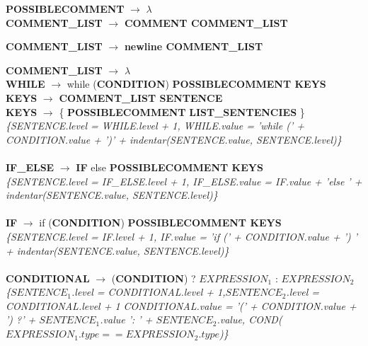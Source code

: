 \documentclass[10pt,a4paper]{article}
\begin{document}
\textbf{POSSIBLECOMMENT} $\rightarrow$ $\lambda$ \\

\textbf{COMMENT\_LIST} $\rightarrow$ \textbf{COMMENT COMMENT\_LIST } 

\textbf{COMMENT\_LIST} $\rightarrow$ \textbf{newline COMMENT\_LIST } 

\textbf{COMMENT\_LIST} $\rightarrow$ $\lambda$ \\

\textbf{WHILE} $\rightarrow$ while (\textbf{CONDITION}) \textbf{POSSIBLECOMMENT KEYS} \\

\textbf{KEYS} $\rightarrow$ \textbf{COMMENT\_LIST SENTENCE} \\ 

\textbf{KEYS} $\rightarrow$ \{ \textbf{POSSIBLECOMMENT} \textbf{LIST\_SENTENCIES} \} \\

\textit{\{SENTENCE.level = WHILE.level + 1, WHILE.value = 'while (' + CONDITION.value + ')' + indentar(SENTENCE.value, SENTENCE.level)\}}  \\ \\

\textbf{IF\_ELSE} $\rightarrow$ \textbf{IF} else \textbf{POSSIBLECOMMENT KEYS} \\

\textit{\{SENTENCE.level = IF\_ELSE.level + 1, IF\_ELSE.value = IF.value + 'else ' + indentar(SENTENCE.value, SENTENCE.level)\}}  \\ \\

\textbf{IF} $\rightarrow$ if (\textbf{CONDITION}) \textbf{POSSIBLECOMMENT KEYS} \\

\textit{\{SENTENCE.level = IF.level + 1, IF.value = 'if (' + CONDITION.value + ') ' + indentar(SENTENCE.value, SENTENCE.level)\}}  \\ \\

\textbf{CONDITIONAL} $\rightarrow$ (\textbf{CONDITION}) ? \textbf{$EXPRESSION_{1}$} : \textbf{$EXPRESSION_{2}$}  \\

\textit{\{$SENTENCE_{1}$.level = CONDITIONAL.level + 1,$SENTENCE_{2}$.level = CONDITIONAL.level + 1 CONDITIONAL.value = '(' + CONDITION.value + ') ?' + $SENTENCE_{1}$.value ': '  + $SENTENCE_{2}$.value, COND($EXPRESSION_{1}.type == EXPRESSION_{2}.type$)\}} \\ \\
	
\end{document}

